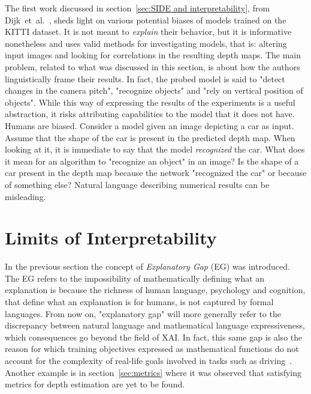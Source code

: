 The first work discussed in section~\ref{sec:SIDE and interpretability}, from Dijk~et~al.~\cite{Dijk}, sheds light on various potential biases of models trained on the KITTI dataset.
It is not meant to \textit{explain} their behavior, but it is informative nonetheless and uses valid methods for investigating models, that is: altering input images and looking for correlations in the resulting depth maps.
The main problem, related to what was discussed in this section, is about how the authors linguistically frame their results.
In fact, the probed model is said to "detect changes in the camera pitch", "recognize objects" and "rely on vertical position of objects".
While this way of expressing the results of the experiments is a useful abstraction, it risks attributing capabilities to the model that it does not have.
Humans are biased.
Consider a model given an image depicting a car as input.
Assume that the shape of the car is present in the predicted depth map.
When looking at it, it is immediate to say that the model \textit{recognized} the car.
What does it mean for an algorithm to "recognize an object" in an image?
Is the shape of a car present in the depth map because the network "recognized the car" or because of something else?
Natural language describing numerical results can be misleading.

\vspace{1cm}

\section{Limits of Interpretability}
\label{sec:limits of interpretability}

In the previous section the concept of \textit{Explanatory Gap} (EG) was introduced.
The EG refers to the impossibility of mathematically defining what an explanation is because the richness of human language, psychology and cognition, that define what an explanation is for humans, is not captured by formal languages.
From now on, "explanatory gap" will more generally refer to the discrepancy between natural language and mathematical language expressiveness, which consequences go beyond the field of XAI.
In fact, this same gap is also the reason for which training objectives expressed as mathematical functions do not account for the complexity of real-life goals involved in tasks such as driving~\cite{Zablocki2022}.
Another example is in section~\ref{sec:metrics} where it was observed that satisfying metrics for depth estimation are yet to be found.

